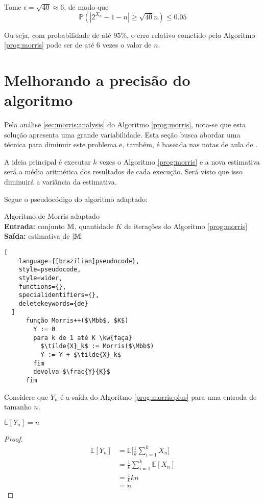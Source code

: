 Tome $\epsilon = \sqrt{40} \approx 6 $, de modo que 
\[ \mathbb{P}(|2^{X_n} - 1 - n| \geq \sqrt{40} n)  \leq 0.05 \]

Ou seja, com probabilidade de até $95\%$, o erro relativo cometido pelo Algoritmo \ref{prog:morris} pode ser de até $6$ vezes o valor de $n$.


\section{Melhorando a precisão do algoritmo}

Pela análise \ref{sec:morris:analysis} do Algoritmo \ref{prog:morris}, nota-se que esta solução apresenta uma grande variabilidade. 
Esta seção busca abordar uma técnica para diminuir este problema e, também, é baseada nas notas de aula de \citep{LectureNotesAndoni}.

A ideia principal é executar $k$ vezes o Algoritmo \ref{prog:morris} e a nova estimativa será a média aritmética dos resultados
de cada execução. Será visto que isso diminuirá a variância da estimativa.

Segue o pseudocódigo do algoritmo adaptado:
\begin{programruledcaption}{
Algoritmo de Morris adaptado\label{prog:morris:plus}
\\ \textbf{Entrada:} conjunto $\mathbb{M}$, quantidade $K$ de iterações do Algoritmo \ref{prog:morris} 
\\ \textbf{Saída:} estimativa de $|\mathbb{M}|$
\label{prog:flajolet-martin}
}
  \begin{lstlisting}[
    language={[brazilian]pseudocode},
    style=pseudocode,
    style=wider,
    functions={},
    specialidentifiers={},
    deletekeywords={de}
  ]
      função Morris++($\Mbb$, $K$)
        Y := 0
        para k de 1 até K \kw{faça}
          $\tilde{X}_k$ := Morris($\Mbb$)
          Y := Y + $\tilde{X}_k$
        fim
        devolva $\frac{Y}{K}$
      fim
  \end{lstlisting}
\end{programruledcaption}

Considere que $Y_n$ é a saída do Algoritmo \ref{prog:morris:plus} para uma entrada de tamanho $n$.

\begin{lemma}\label{morris:plus:expected_value}
  $\mathbb{E}[Y_n] = n$
\end{lemma}

\begin{proof}

\begin{align*}
  \mathbb{E}[Y_n] 
    &= \mathbb{E} \Big[ \frac{1}{k} \sum_{i=1}^{k} X_n \Big]  \\
    &= \frac{1}{k} \sum_{i=1}^{k} \mathbb{E}[X_n] \\
    &= \frac{1}{k} k n  \\
    &= n
\end{align*}

\end{proof}

